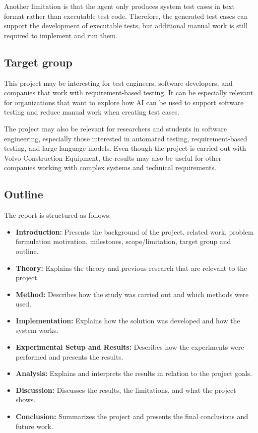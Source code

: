 \documentclass[a4paper,12pt]{article}
\begin{document}
Another limitation is that the agent only produces system test cases in text format rather than executable test code. Therefore, the generated test cases can support the development of executable tests, but additional manual work is still required to implement and run them.

\subsection{Target group}
This project may be interesting for test engineers, software developers, and companies that work with requirement-based testing. It can be especially relevant for organizations that want to explore how AI can be used to support software testing and reduce manual work when creating test cases.

The project may also be relevant for researchers and students in software engineering, especially those interested in automated testing, requirement-based testing, and large language models. Even though the project is carried out with Volvo Construction Equipment, the results may also be useful for other companies working with complex systems and technical requirements.

\subsection{Outline}
The report is structured as follows:
\begin{itemize}
    \item \textbf{Introduction:} Presents the background of the project, related work, problem formulation motivation, milestones, scope/limitation, target group and outline.
    \item \textbf{Theory:} Explains the theory and previous research that are relevant to the project.
    \item \textbf{Method:} Describes how the study was carried out and which methods were used.
    \item \textbf{Implementation:} Explains how the solution was developed and how the system works.
    \item \textbf{Experimental Setup and Results:} Describes how the experiments were performed and presents the results.
    \item \textbf{Analysis:} Explains and interprets the results in relation to the project goals.
    \item \textbf{Discussion:} Discusses the results, the limitations, and what the project shows.
    \item \textbf{Conclusion:} Summarizes the project and presents the final conclusions and future work.
\end{itemize}
\end{document}
